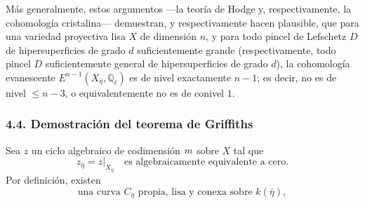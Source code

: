 Más generalmente, estos argumentos ---la teoría de Hodge y,
respectivamente, la cohomología cristalina--- demuestran, y
respectivamente hacen plausible, que para una variedad proyectiva lisa
$X$ de dimensión $n$, y para todo pincel de Lefschetz $D$ de
hipersuperficies de grado $d$ suficientemente grande (respectivamente,
todo pincel $D$ suficientemente general de hipersuperficies de grado
$d$), la cohomología evanescente
$E^{n-1}(X_{\bar\eta},\mathbb Q_\ell)$ es de nivel exactamente $n-1$;
es decir, no es de nivel $\leq n-3$, o equivalentemente no es de conivel
$1$.

\subsubsection*{4.4. Demostración del teorema de Griffiths}

Sea $z$ un ciclo algebraico de codimensión $\sisi{n}{m}$ sobre $X$ tal
que
\begin{equation}\tag{4.4.1}
z_{\bar\eta}=z|_{X_{\bar\eta}}
\quad\text{es algebraicamente equivalente a cero}.
\end{equation}
Por definición, existen
\begin{equation}\tag{4.4.2}
\text{una curva $C_{\bar\eta}$ propia, lisa y conexa sobre $k(\bar\eta)$},
\end{equation}

\pageoriginale

